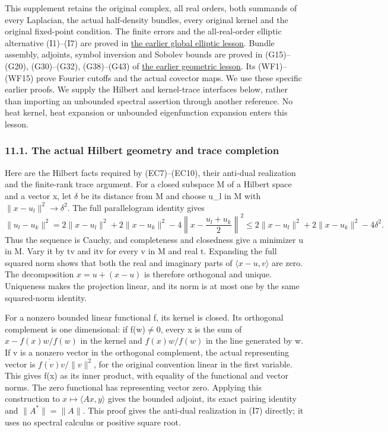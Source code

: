 \documentclass[
  11pt,
]{article}
\begin{document}
This supplement retains the original complex, all real orders, both
summands of every Laplacian, the actual half-density bundles, every
original kernel and the original fixed-point condition. The finite
errors and the all-real-order elliptic alternative (I1)--(I7) are proved
in \href{global-elliptic-symbol-index.pdf}{the earlier global elliptic
lesson}. Bundle assembly, adjoints, symbol inversion and Sobolev bounds
are proved in (G15)--(G20), (G30)--(G32), (G38)--(G43) of
\href{geometric-microlocal-calculus.pdf}{the earlier geometric lesson}.
Its (WF1)--(WF15) prove Fourier cutoffs and the actual covector maps. We
use these specific earlier proofs. We supply the Hilbert and
kernel-trace interfaces below, rather than importing an unbounded
spectral assertion through another reference. No heat kernel, heat
expansion or unbounded eigenfunction expansion enters this lesson.

\subsubsection{11.1. The actual Hilbert geometry and trace
completion}\label{the-actual-hilbert-geometry-and-trace-completion}

Here are the Hilbert facts required by (EC7)--(EC10), their anti-dual
realization and the finite-rank trace argument. For a closed subspace M
of a Hilbert space and a vector x, let \ensuremath{\delta} be its distance from M and
choose u\_l in M with \(\|x-u_l\|^2\to\delta^2\). The full parallelogram
identity gives \[
\|u_l-u_k\|^2
 =2\|x-u_l\|^2+2\|x-u_k\|^2
       -4\left\|x-\frac{u_l+u_k}{2}\right\|^2
 \leq 2\|x-u_l\|^2+2\|x-u_k\|^2-4\delta^2.
\tag{LC1}
\] Thus the sequence is Cauchy, and completeness and closedness give a
minimizer u in M. Vary it by tv and itv for every v in M and real t.
Expanding the full squared norm shows that both the real and imaginary
parts of \(\langle x-u,v\rangle\) are zero. The decomposition
\(x=u+(x-u)\) is therefore orthogonal and unique. Uniqueness makes the
projection linear, and its norm is at most one by the same squared-norm
identity.

For a nonzero bounded linear functional f, its kernel is closed. Its
orthogonal complement is one dimensional: if f(w)\ensuremath{\ne}0, every x is the sum
of \(x-f(x)w/f(w)\) in the kernel and \(f(x)w/f(w)\) in the line
generated by w. If v is a nonzero vector in the orthogonal complement,
the actual representing vector is \(\overline{f(v)}v/\|v\|^2\), for the
original convention linear in the first variable. This gives f(x) as its
inner product, with equality of the functional and vector norms. The
zero functional has representing vector zero. Applying this construction
to \(x\mapsto\langle Ax,y\rangle\) gives the bounded adjoint, its exact
pairing identity and \(\|A^*\|=\|A\|\). This proof gives the anti-dual
realization in (I7) directly; it uses no spectral calculus or positive
square root.
\end{document}
